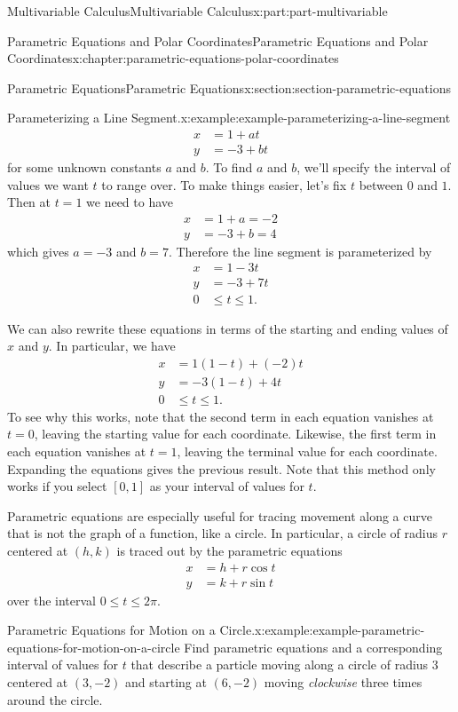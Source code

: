 \documentclass[twoside,10pt,]{tufte-book}
\numberwithin{equation}{part}
\newcommand{\amp}{&}
\begin{document}
\begin{partptx}{Multivariable Calculus}{}{Multivariable Calculus}{}{}{x:part:part-multivariable}
\begin{chapterptx}{Parametric Equations and Polar Coordinates}{}{Parametric Equations and Polar Coordinates}{}{}{x:chapter:parametric-equations-polar-coordinates}
\begin{sectionptx}{Parametric Equations}{}{Parametric Equations}{}{}{x:section:section-parametric-equations}
\begin{example}{Parameterizing a Line Segment.}{x:example:example-parameterizing-a-line-segment}
\begin{align*}
x \amp = 1 + at \\
y \amp = -3 + bt 
\end{align*}
for some unknown constants \(a\) and \(b\). To find \(a\) and \(b\), we'll specify the interval of values we want \(t\) to range over. To make things easier, let's fix \(t\) between \(0\) and \(1\). Then at \(t = 1\) we need to have%
\begin{align*}
x \amp = 1 + a = -2 \\
y \amp = -3 + b = 4 
\end{align*}
which gives \(a = -3\) and \(b = 7\). Therefore the line segment is parameterized by%
\begin{align*}
x \amp = 1 - 3t \\
y \amp = -3 + 7t \\
0 \amp \leq t\leq 1 \text{.}
\end{align*}
%
\par
We can also rewrite these equations in terms of the starting and ending values of \(x\) and \(y\). In particular, we have%
\begin{align*}
x \amp = 1(1 - t) + (-2)t \\
y \amp = -3(1 - t) + 4t \\
0 \amp \leq t\leq 1 \text{.}
\end{align*}
To see why this works, note that the second term in each equation vanishes at \(t = 0\), leaving the starting value for each coordinate. Likewise, the first term in each equation vanishes at \(t = 1\), leaving the terminal value for each coordinate. Expanding the equations gives the previous result. Note that this method only works if you select \([0,1]\) as your interval of values for \(t\).%
\end{example}
Parametric equations are especially useful for tracing movement along a curve that is not the graph of a function, like a circle. In particular, a circle of radius \(r\) centered at \((h,k)\) is traced out by the parametric equations%
\begin{align*}
x \amp = h + r\cos t \\
y \amp = k + r\sin t 
\end{align*}
over the interval \(0\leq t\leq 2\pi\).%
\begin{example}{Parametric Equations for Motion on a Circle.}{x:example:example-parametric-equations-for-motion-on-a-circle}%
Find parametric equations and a corresponding interval of values for \(t\) that describe a particle moving along a circle of radius \(3\) centered at \((3,-2)\) and starting at \((6,-2)\) moving \emph{clockwise} three times around the circle.%

\end{example}
\end{sectionptx}
\end{chapterptx}
\end{partptx}
\end{document}
